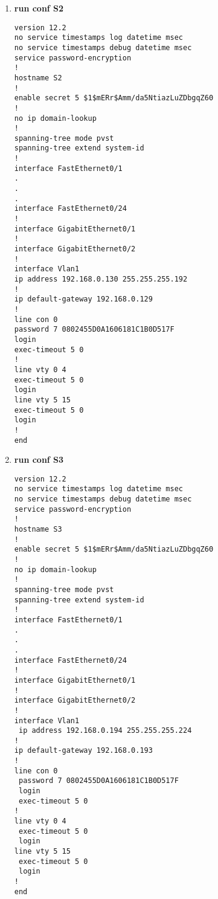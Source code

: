 \documentclass[a4paper,14pt]{extarticle}
\begin{document}
\begin{enumerate}
\begin{lstlisting}
service password-encryption
!
hostname S1
!
enable secret 5 $1$mERr$Amm/da5NtiazLuZDbgqZ60
!
no ip domain-lookup
!
spanning-tree mode pvst
spanning-tree extend system-id
!
interface FastEthernet0/1
.
.
.
interface FastEthernet0/24
!
interface GigabitEthernet0/1
!
interface GigabitEthernet0/2
!
interface Vlan1
ip address 192.168.0.2 255.255.255.128
!
ip default-gateway 192.168.0.1
!
line con 0
password 7 0802455D0A1606181C1B0D517F
login
exec-timeout 5 0
!
line vty 0 4
exec-timeout 5 0
login
line vty 5 15
exec-timeout 5 0
login
!
end 
        \end{lstlisting}
        \item \textbf{run conf S2}
        \begin{lstlisting}
version 12.2
no service timestamps log datetime msec
no service timestamps debug datetime msec
service password-encryption
!
hostname S2
!
enable secret 5 $1$mERr$Amm/da5NtiazLuZDbgqZ60
!
no ip domain-lookup
!
spanning-tree mode pvst
spanning-tree extend system-id
!
interface FastEthernet0/1
.
.
.
interface FastEthernet0/24
!
interface GigabitEthernet0/1
!
interface GigabitEthernet0/2
!
interface Vlan1
ip address 192.168.0.130 255.255.255.192
!
ip default-gateway 192.168.0.129
!
line con 0
password 7 0802455D0A1606181C1B0D517F
login
exec-timeout 5 0
!
line vty 0 4
exec-timeout 5 0
login
line vty 5 15
exec-timeout 5 0
login
!
end 
        \end{lstlisting}
        \item \textbf{run conf S3}
        \begin{lstlisting}
version 12.2
no service timestamps log datetime msec
no service timestamps debug datetime msec
service password-encryption
!
hostname S3
!
enable secret 5 $1$mERr$Amm/da5NtiazLuZDbgqZ60
!
no ip domain-lookup
!
spanning-tree mode pvst
spanning-tree extend system-id
!
interface FastEthernet0/1
.
.
.
interface FastEthernet0/24
!
interface GigabitEthernet0/1
!
interface GigabitEthernet0/2
!
interface Vlan1
 ip address 192.168.0.194 255.255.255.224
!
ip default-gateway 192.168.0.193
!
line con 0
 password 7 0802455D0A1606181C1B0D517F
 login
 exec-timeout 5 0
!
line vty 0 4
 exec-timeout 5 0
 login
line vty 5 15
 exec-timeout 5 0
 login
!
end
        \end{lstlisting}
    \end{enumerate}
\end{document}
